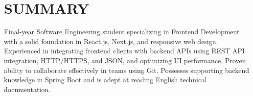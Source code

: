 \section{SUMMARY}
\noindent Final-year Software Engineering student specializing in Frontend Development with a solid foundation in React.js, Next.js, and responsive web design. Experienced in integrating frontend clients with backend APIs using REST API integration, HTTP/HTTPS, and JSON, and optimizing UI performance. Proven ability to collaborate effectively in teams using Git. Possesses supporting backend knowledge in Spring Boot and is adept at reading English technical documentation.
